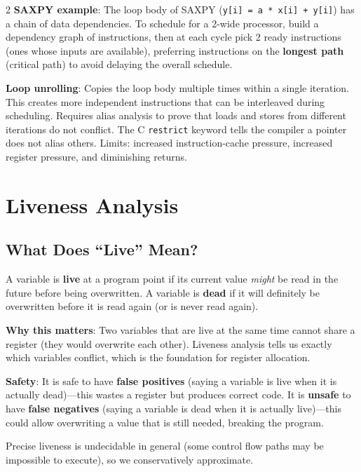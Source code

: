 \documentclass[9pt,landscape]{extarticle}
\begin{document}
\begin{multicols}{2}
\textbf{SAXPY example}: The loop body of SAXPY (\texttt{y[i] = a * x[i] + y[i]}) has a chain of data dependencies. To schedule for a 2-wide processor, build a dependency graph of instructions, then at each cycle pick 2 ready instructions (ones whose inputs are available), preferring instructions on the \textbf{longest path} (critical path) to avoid delaying the overall schedule.

\textbf{Loop unrolling}: Copies the loop body multiple times within a single iteration. This creates more independent instructions that can be interleaved during scheduling. Requires alias analysis to prove that loads and stores from different iterations do not conflict. The C \texttt{restrict} keyword tells the compiler a pointer does not alias others. Limits: increased instruction-cache pressure, increased register pressure, and diminishing returns.

\section{Liveness Analysis}

\subsection{What Does ``Live'' Mean?}

A variable is \textbf{live} at a program point if its current value \emph{might} be read in the future before being overwritten. A variable is \textbf{dead} if it will definitely be overwritten before it is read again (or is never read again).

\textbf{Why this matters}: Two variables that are live at the same time cannot share a register (they would overwrite each other). Liveness analysis tells us exactly which variables conflict, which is the foundation for register allocation.

\textbf{Safety}: It is safe to have \textbf{false positives} (saying a variable is live when it is actually dead)---this wastes a register but produces correct code. It is \textbf{unsafe} to have \textbf{false negatives} (saying a variable is dead when it is actually live)---this could allow overwriting a value that is still needed, breaking the program.

Precise liveness is undecidable in general (some control flow paths may be impossible to execute), so we conservatively approximate.


\end{multicols}
\end{document}
